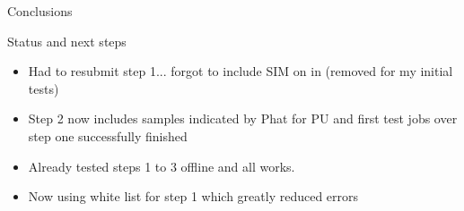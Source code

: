\documentclass[8pt]{beamer}
\begin{document}
\begin{frame}{Conclusions}

\begin{block}{Status and next steps}

\begin{itemize}
  \item Had to resubmit step 1... forgot to include SIM on in (removed for my initial tests)
  \item Step 2 now includes samples indicated by Phat for PU and first test jobs over step one successfully finished
  \item Already tested steps 1 to 3 offline and all works.
  \item Now using white list for step 1 which greatly reduced errors
\end{itemize} 

\end{block}

\end{frame}
\end{document}
